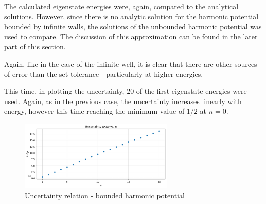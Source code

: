 \documentclass[11pt]{article}
\begin{document}
The calculated eigenstate energies were, again, compared to the analytical solutions.
However, since there is no analytic solution for the harmonic potential bounded by
infinite walls, the solutions of the unbounded harmonic potential was used to compare.
The discussion of this approximation can be found in the later part of this section.

Again, like in the case of the infinite well, it is clear that there are other
sources of error than the set tolerance - particularly at higher energies.

This time, in plotting the uncertainty,
20 of the first eigenstate energies were used. Again, as in the 
previous case, the uncertainty increases linearly with energy,
however this time reaching the minimum value of $1/2$ at $n=0$.

\begin{figure}[!h]
    \centering
    \includegraphics[width=0.65\textwidth]{uncertainty2.png}
    \caption{Uncertainty relation - bounded harmonic potential}
\end{figure}

\pagebreak
\end{document}
